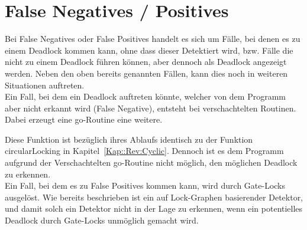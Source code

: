 \section{False Negatives / Positives} \label{Kap::Rev:False}
Bei False Negatives oder False Positives handelt es sich um Fälle, bei denen es 
zu einem Deadlock kommen kann, ohne dass dieser Detektiert wird, bzw. Fälle die
nicht zu einem 
Deadlock führen können, aber dennoch als Deadlock angezeigt werden. 
Neben den oben bereits genannten Fällen, kann dies noch in weiteren Situationen
auftreten.\\
Ein Fall,
bei dem ein Deadlock auftreten könnte, welcher von dem Programm aber nicht erkannt
wird (False Negative), entsteht bei verschachtelten Routinen. Dabei erzeugt eine go-Routine eine 
weitere.
\begin{figure}[H]
    
\end{figure}
Diese Funktion ist bezüglich ihres Ablaufs identisch zu der Funktion 
circularLocking in Kapitel~\ref*{Kap::Rev:Cyclic}. Dennoch ist es dem 
Programm aufgrund der Verschachtelten go-Routine nicht möglich, den möglichen 
Deadlock zu erkennen. \\
Ein Fall, bei dem es zu False Positives kommen kann, wird durch Gate-Locks
ausgelöst. Wie bereits beschrieben ist ein auf Lock-Graphen basierender Detektor,
und damit solch ein Detektor nicht in der Lage zu erkennen, wenn ein 
potentielles Deadlock durch Gate-Locks unmöglich gemacht wird.
